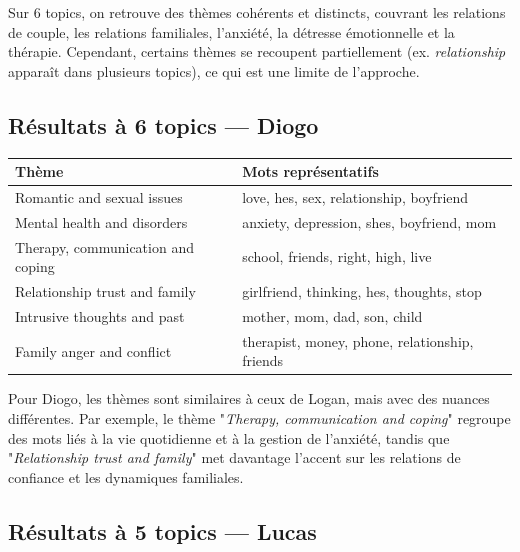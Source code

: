\documentclass[12pt,a4paper]{report}
\begin{document}
\begin{note}[Interprétation]
Sur 6 topics, on retrouve des thèmes cohérents et distincts, couvrant les relations de couple, les relations familiales, l'anxiété, la détresse émotionnelle et la thérapie.
Cependant, certains thèmes se recoupent partiellement (ex. \textit{relationship} apparaît dans plusieurs topics), ce qui est une limite de l'approche.
\end{note}

\subsection{Résultats à 6 topics — Diogo}

\begin{center}
\begin{tabular}{@{}ll@{}}
\toprule
\textbf{Thème} & \textbf{Mots représentatifs} \\
\midrule
Romantic and sexual issues              & love, hes, sex, relationship, boyfriend \\
Mental health and disorders             & anxiety, depression, shes, boyfriend, mom \\
Therapy, communication and coping       & school, friends, right, high, live \\
Relationship trust and family           & girlfriend, thinking, hes, thoughts, stop \\
Intrusive thoughts and past             & mother, mom, dad, son, child \\
Family anger and conflict               & therapist, money, phone, relationship, friends \\
\bottomrule
\end{tabular}
\end{center}

\begin{note}[Interprétation]
Pour Diogo, les thèmes sont similaires à ceux de Logan, mais avec des nuances différentes. Par exemple, le thème "\textit{Therapy, communication and coping}" 
regroupe des mots liés à la vie quotidienne et à la gestion de l'anxiété, tandis que "\textit{Relationship trust and family}" met davantage l'accent sur les 
relations de confiance et les dynamiques familiales.
\end{note}

\pagebreak

\subsection{Résultats à 5 topics — Lucas}
\end{document}
